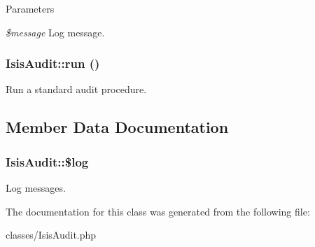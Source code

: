 \begin{DoxyParams}{Parameters}
\item[{\em \$message}]Log message. \end{DoxyParams}
\hypertarget{classIsisAudit_a2fb1d5a12933f63f396188bc4229f671}{
\subsubsection[{run}]{\setlength{\rightskip}{0pt plus 5cm}IsisAudit::run ()}}
\label{classIsisAudit_a2fb1d5a12933f63f396188bc4229f671}
Run a standard audit procedure. 

\subsection{Member Data Documentation}
\hypertarget{classIsisAudit_ab4bb04f3deedf206358a2cedfe3c2294}{
\subsubsection[{\$log}]{\setlength{\rightskip}{0pt plus 5cm}IsisAudit::\$log}}
\label{classIsisAudit_ab4bb04f3deedf206358a2cedfe3c2294}
Log messages. 

The documentation for this class was generated from the following file:\begin{DoxyCompactItemize}
\item 
classes/IsisAudit.php\end{DoxyCompactItemize}
